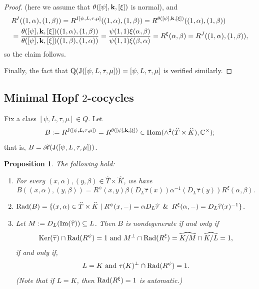 \documentclass{amsart}
\newtheorem{proposition}[theorem]{Proposition}
\theoremstyle{definition}
\newcommand{\Hom}{{\rm Hom}}
\numberwithin{equation}{section}
\begin{document}
\begin{proof}
(here we assume that $\theta([\psi],{\bf k},[\xi])$ is normal), and
\begin{equation*}
\begin{split}
& R^{I}((1,\alpha),(1,\beta))=R^{{\rm J}[\psi,L,\tau,\mu]}((1,\alpha),(1,\beta))=R^{\theta([\psi],{\bf k},[\xi])}((1,\alpha),(1,\beta))\\
& =\frac{\theta([\psi],{\bf k},[\xi])((1,\alpha),(1,\beta))}{\theta([\psi],{\bf k},[\xi])((1,\beta),(1,\alpha))}=\frac{\psi(1,1)\xi(\alpha,\beta)}{\psi(1,1)\xi(\beta,\alpha)}=R^{\xi}(\alpha,\beta)=R^{J}((1,\alpha),(1,\beta)),
\end{split}
\end{equation*}
so the claim follows.

Finally, the fact that ${\rm Q}({\rm J}([\psi,L,\tau,\mu]))=[\psi,L,\tau,\mu]$ is verified similarly.
\end{proof}

\subsection{Minimal Hopf $2$-cocycles} 
Fix a class $[\psi,L,\tau,\mu]\in Q$. Let
\begin{equation}\label{ndB}
B:=R^{{\rm J}([\psi,L,\tau,\mu])}=R^{\theta([\psi],\mathbf{k},[\xi])}\in\Hom(\wedge^2(\widehat{T}\times \widehat{K}),\mathbb{C}^{\times});
\end{equation}
that is, $B=\mathscr{R}({\rm J}([\psi,L,\tau,\mu]))$. 

\begin{proposition}
The following hold:
\begin{enumerate}
\item
For every $(x,\alpha),(y,\beta)\in \widehat{T}\times \widehat{K}$, we have
\begin{equation*}
B((x,\alpha),(y,\beta))=R^{\psi}(x,y)\beta(D_L\widehat{\tau}(x))\alpha^{-1}(D_L\widehat{\tau}(y))R^{\xi}(\alpha,\beta).
\end{equation*}
\item
${\rm Rad}(B)=\{(x,\alpha)\in \widehat{T}\times \widehat{K}\mid R^{\psi}(x,-)=\alpha D_L\widehat{\tau}\,\,\,\&\,\,\,R^{\xi}(\alpha,-)=D_L\widehat{\tau}(x)^{-1}\}$.
\item  
Let $M:=D_L({\rm Im}(\widehat{\tau}))\subseteq L$. Then $B$ is nondegenerate if and only if 
$${\rm Ker}(\widehat{\tau})\cap {\rm Rad}(R^{\psi})=1\text{ and }M^{\perp}\cap {\rm Rad}(R^{\xi})=\widehat{K/M}\cap \widehat{K/L}=1,$$
if and only if,  
$$L=K\text{ and }\tau(K)^{\perp}\cap {\rm Rad}(R^{\psi})=1.$$
(Note that if $L=K$, then ${\rm Rad}(R^{\xi})=1$ is automatic.)
\end{enumerate}
\end{proposition}
\end{document}
